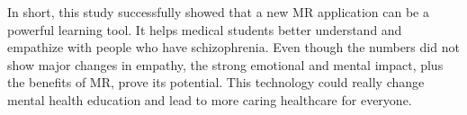 In short, this study successfully showed that a new MR application can be a powerful learning tool. It helps medical students better understand and empathize with people who have schizophrenia. Even though the numbers did not show major changes in empathy, the strong emotional and mental impact, plus the benefits of MR, prove its potential. This technology could really change mental health education and lead to more caring healthcare for everyone.